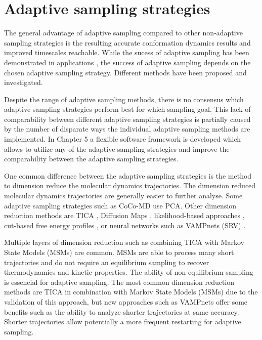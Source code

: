 \section{\label{sec:intro2}Adaptive sampling strategies}
The general advantage of adaptive sampling compared to other non-adaptive sampling strategies is the resulting accurate conformation dynamics results and improved timescales reachable. While the sucess of adaptive sampling has been demonstrated in applications \cite{Wieczorek2016,Plattner20171005,Kohlhoff201415}, the success of adaptive sampling depends on the chosen adaptive sampling strategy. Different methods have been proposed and investigated\cite{Fabritiis-2014,
AdaptivePELE-Lecina2017, preto2014fast, doerr2016htmd,
weexplore, prattWESTPAAdvancesSampling2018, Adstrategies2018, FUNN, FAST, harada2015jctc, singhal2005error, bowman2010enhanced,
weber2011characterization,  EvolutionCoupling-Shamsi2017, FAST-Bowman-2015, 
Strategies-erros-reduce, plattner2017complete, WESTPA-Zwier2015}. 

Despite the range of adaptive sampling methods, there is no consensus which adaptive sampling strategies perform best for which sampling goal. This lack of comparability between different adaptive sampling strategies is partially caused by the number of disparate ways the individual adaptive sampling methods are implemented. In Chapter 5 a flexible software framework is developed which allows to utilize any of the adaptive sampling strategies and improve the comparability between the adaptive sampling strategies.

One common difference between the adaptive sampling strategies is the method to dimension reduce the molecular dynamics trajectories. The dimension reduced molecular dynamics trajectories are generally easier to further analyse.
Some adaptive sampling strategies such as CoCo-MD\cite{shkurti2019jctc,harada2015jctc,harada2017jctc} use PCA. Other dimension reduction methods are TICA\cite{TICA1-perez2013, TICA2-schwantes2013}
, Diffusion Maps \cite{Coifman7426, rohrdanz2011determination,Zheng2011, Boninsegna2015},
likelihood-based approaches \cite{peters2006obtaining}, cut-based free energy
profiles \cite{krivov2008diffusive}, or neural networks such as VAMPnets (SRV)
\cite{Mardt2018,wehmeyer2018time, ribeiro2018reweighted, chen2019jcp}. 

Multiple layers of dimension reduction such as combining TICA with Markov State Models (MSMs) \cite{prinz2011markov,
MSM-Pande-2018,bookmsm,masterequationsMSM,SCHUTTE1999146} are common. MSMs are able to process many short trajectories and
do not require an equilibrium sampling to recover thermodynamics and kinetic properties. The ability of non-equilibrium sampling is essencial for adaptive sampling.
The most common dimension reduction methods are TICA in combination with Markov State Models (MSMs) due to the validation of this approach, but new approaches such as VAMPnets offer some benefits such as the ability to analyze shorter trajectories at same accuracy. Shorter trajectories allow potentially a more frequent restarting for adaptive sampling.

